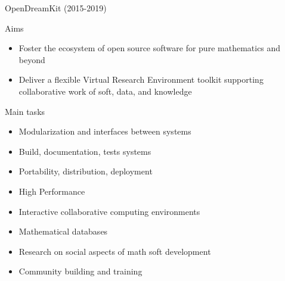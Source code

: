 \documentclass[
  usenames,svgnames, %
  compress,
  ]{beamer}
\begin{document}
\begin{frame}{OpenDreamKit (2015-2019)}
  \begin{block}{Aims}
    \begin{itemize}
    \item Foster the ecosystem of open source software for pure
      mathematics and beyond
    \item Deliver a flexible Virtual Research Environment toolkit
      supporting collaborative work of soft, data, and knowledge
    \end{itemize}
  \end{block}

  \begin{block}{Main tasks}
    \begin{itemize}
    \item Modularization and interfaces between systems
    \item Build, documentation, tests systems
    \item Portability, distribution, deployment
    \item High Performance
    \item Interactive collaborative computing environments
    \item Mathematical databases
    \item Research on social aspects of math soft development
    \item Community building and training
    \end{itemize}
  \end{block}
\end{frame}


\end{document}
